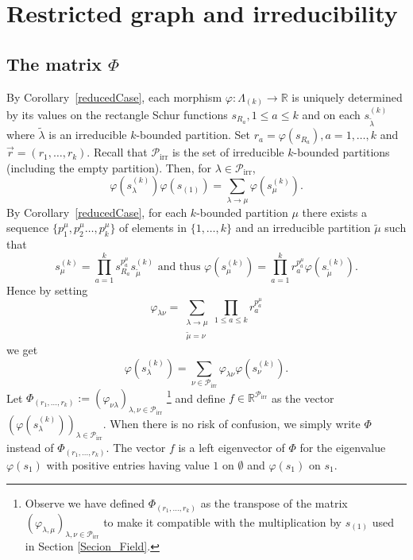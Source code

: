 \documentclass[10pt,a4paper]{amsart}
\theoremstyle{definition}
\DeclareMathOperator{\irr}{irr}
\begin{document}
\section{Restricted graph and irreducibility}\label{section3}

\subsection{The matrix \texorpdfstring{$\Phi$}{Phi}}

\label{subsec_MatrixFI}By Corollary~\ref{reducedCase}, each morphism
$\varphi:\Lambda_{(k)}\rightarrow\mathbb{R}$ is uniquely determined by its
values on the rectangle Schur functions $s_{R_{a}},1\leq a\leq k$ and on each
$s_{\tilde{\lambda}}^{(k)}$ where $\tilde{\lambda}$ is an irreducible
$k$-bounded partition. Set $r_{a}=\varphi(s_{R_{a}}),a=1,\ldots,k$ and
$\vec{r}=(r_{1},\ldots,r_{k})$. Recall that $\mathcal{P}_{\irr }$ is
the set of irreducible $k$-bounded partitions (including the empty partition).
Then, for $\lambda\in\mathcal{P}_{\irr }$,
\begin{equation}
\varphi(s_{\lambda}^{(k)})\varphi(s_{(1)})=\sum_{\lambda\rightarrow\mu}%
\varphi(s_{\mu}^{(k)}). \label{PieriPhi}%
\end{equation}
By Corollary~\ref{reducedCase}, for each $k$-bounded partition $\mu$ there
exists a sequence $\{p_{1}^{\mu},p_{2}^{\mu}\ldots,p_{k}^{\mu}\}$ of elements
in $\{1,\dots,k\}$ and an irreducible partition $\widetilde{\mu}$ such that
\begin{equation}
s_{\mu}^{(k)}=\prod_{a=1}^{k}s_{R_{a}}^{p_{a}^{\mu}}s_{\widetilde{\mu}}%
^{(k)}\text{ and thus }\varphi(s_{\mu}^{(k)})=\prod_{a=1}^{k}r_{a}^{p_{a}%
^{\mu}}\varphi(s_{\widetilde{\mu}}^{(k)}). \label{decompos}%
\end{equation}
Hence by setting
\[
\varphi_{\lambda\nu}=\sum_{\substack{\lambda\rightarrow\mu\\\widetilde{\mu
}=\nu}}\prod_{1\leq a\leq k}r_{a}^{p_{a}^{\mu}}%
\]
we get
\[
\varphi(s_{\lambda}^{(k)})=\sum_{\nu\in\mathcal{P}_{\irr }}%
\varphi_{\lambda\nu}\varphi(s_{\nu}^{(k)}).
\]
Let $\Phi_{(r_{1},\ldots,r_{k})}:=(\varphi_{\nu\lambda})_{\lambda,\nu
\in\mathcal{P}_{\irr }}$ \footnote{Observe we have defined
$\Phi_{(r_{1},\ldots,r_{k})}$ as the transpose of the matrix $(\varphi
_{\lambda,\mu})_{\lambda,\nu\in\mathcal{P}_{\irr }}$ to make it
compatible with the multiplication by $s_{(1)}$ used in Section
\ref{Secion_Field}.} and define $f\in\mathbb{R}^{\mathcal{P}_{\irr }}$
as the vector $(\varphi(s_{\lambda}^{(k)}))_{\lambda\in\mathcal{P}%
_{\irr }}$. When there is no risk of confusion, we simply write $\Phi$
instead of $\Phi_{(r_{1},\ldots,r_{k})}$. The vector $f$ is a left eigenvector
of $\Phi$ for the eigenvalue $\varphi(s_{1})$ with positive entries having
value $1$ on $\emptyset$ and $\varphi(s_{1})$ on $s_{1}$.
\end{document}
